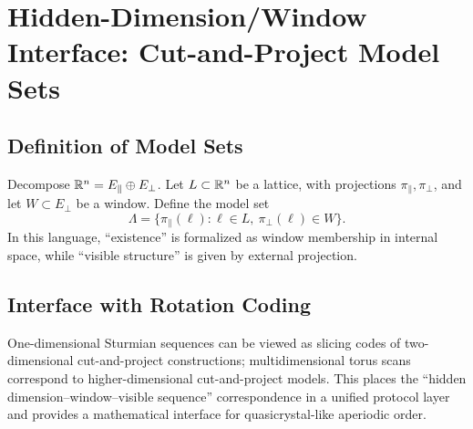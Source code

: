 ﻿\section{Hidden-Dimension/Window Interface: Cut-and-Project Model Sets}

\subsection{Definition of Model Sets}

Decompose $\mathbb{R}^n=E_\parallel\oplus E_\perp$. Let $L\subset\mathbb{R}^n$ be a lattice, with projections $\pi_\parallel,\pi_\perp$, and let $W\subset E_\perp$ be a window. Define the model set
\[
\Lambda=\{\pi_\parallel(\ell):\ell\in L,\ \pi_\perp(\ell)\in W\}.
\]
In this language, ``existence'' is formalized as window membership in internal space, while ``visible structure'' is given by external projection.

\subsection{Interface with Rotation Coding}

One-dimensional Sturmian sequences can be viewed as slicing codes of two-dimensional cut-and-project constructions; multidimensional torus scans correspond to higher-dimensional cut-and-project models. This places the ``hidden dimension--window--visible sequence'' correspondence in a unified protocol layer and provides a mathematical interface for quasicrystal-like aperiodic order.
